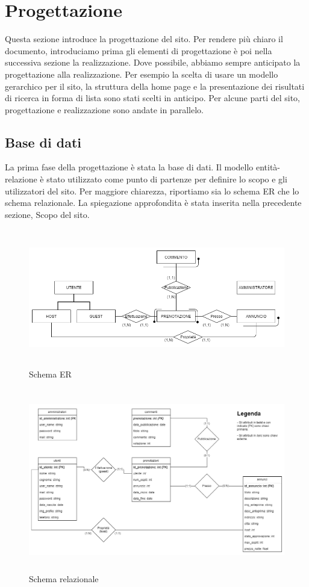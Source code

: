 \documentclass[1_relazione.tex]{subfiles}
\begin{document}
\section{Progettazione}
Questa sezione introduce la progettazione del sito. Per rendere più chiaro il documento, introduciamo prima gli elementi di progettazione è poi nella successiva sezione la realizzazione. Dove possibile, abbiamo sempre anticipato la progettazione alla realizzazione. Per esempio la scelta di usare un modello gerarchico per il sito, la struttura della home page e la presentazione dei risultati di ricerca in forma di lista sono stati scelti in anticipo. Per alcune parti del sito, progettazione e realizzazione sono andate in parallelo. 

\subsection{Base di dati}
La prima fase della progettazione è stata la base di dati.  Il modello entità-relazione è stato utilizzato come punto di partenze per definire lo scopo e gli utilizzatori del sito. Per maggiore chiarezza, riportiamo sia lo schema ER che lo schema relazionale. La spiegazione approfondita è stata inserita nella precedente sezione, Scopo del sito.

\begin{figure}[h]
\centering
\includegraphics[width=14cm, height=6cm]{immagini/schema_ER-2}
\caption{Schema ER }
\end{figure}

\begin{figure}[h]
\centering
\includegraphics[width=14cm, height=8cm]{immagini/schema_relazionale-2}
\caption{Schema relazionale }
\end{figure}
\end{document}
